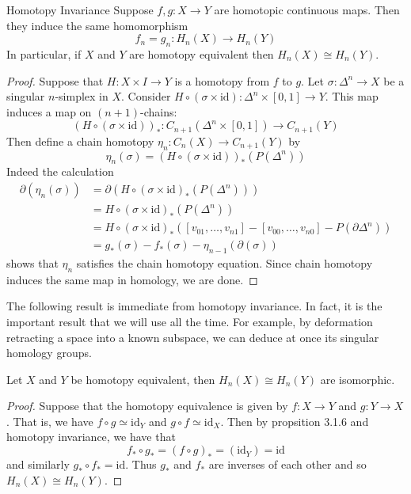 \documentclass[a4paper]{article}
\begin{document}
\begin{thm}{Homotopy Invariance}{} Suppose $f,g:X\to Y$ are homotopic continuous maps. Then they induce the same homomorphism $$f_n=g_n:H_n(X)\to H_n(Y)$$ In particular, if $X$ and $Y$ are homotopy equivalent then $H_n(X)\cong H_n(Y)$. 
\begin{proof}
Suppose that $H:X\times I\to Y$ is a homotopy from $f$ to $g$. Let $\sigma:\Delta^n\to X$ be a singular $n$-simplex in $X$. Consider $H\circ(\sigma\times\text{id}):\Delta^n\times[0,1]\to Y$. This map induces a map on $(n+1)$-chains: $$(H\circ(\sigma\times\text{id}))_\ast:C_{n+1}(\Delta^n\times[0,1])\to C_{n+1}(Y)$$ Then define a chain homotopy $\eta_n:C_n(X)\to C_{n+1}(Y)$ by $$\eta_n(\sigma)=(H\circ(\sigma\times\text{id}))_\ast(P(\Delta^n))$$ Indeed the calculation
\begin{align*}
\partial(\eta_n(\sigma))&=\partial(H\circ(\sigma\times\text{id})_\ast(P(\Delta^n)))\tag{Definition of $\eta_n$}\\
&=H\circ(\sigma\times\text{id})_\ast(P(\Delta^n))\tag{Chain map}\\
&=H\circ(\sigma\times\text{id})_\ast([v_{01},\dots,v_{n1}]-[v_{00},\dots,v_{n0}]-P(\partial\Delta^n))\tag{By the above lemma}\\
&=g_\ast(\sigma)-f_\ast(\sigma)-\eta_{n-1}(\partial(\sigma))
\end{align*}
shows that $\eta_n$ satisfies the chain homotopy equation. Since chain homotopy induces the same map in homology, we are done. 
\end{proof}
\end{thm}

The following result is immediate from homotopy invariance. In fact, it is the important result that we will use all the time. For example, by deformation retracting a space into a known subspace, we can deduce at once its singular homology groups. 

\begin{crl}{}{} Let $X$ and $Y$ be homotopy equivalent, then $H_n(X)\cong H_n(Y)$ are isomorphic. 
\begin{proof}
Suppose that the homotopy equivalence is given by $f:X\to Y$ and $g:Y\to X$. That is, we have $f\circ g\simeq\text{id}_Y$ and $g\circ f\simeq\text{id}_X$. Then by propsition 3.1.6 and homotopy invariance, we have that $$f_\ast\circ g_\ast=(f\circ g)_\ast=(\text{id}_Y)=\text{id}$$ and similarly $g_\ast\circ f_\ast=\text{id}$. Thus $g_\ast$ and $f_\ast$ are inverses of each other and so $H_n(X)\cong H_n(Y)$. 
\end{proof}
\end{crl}
\end{document}
